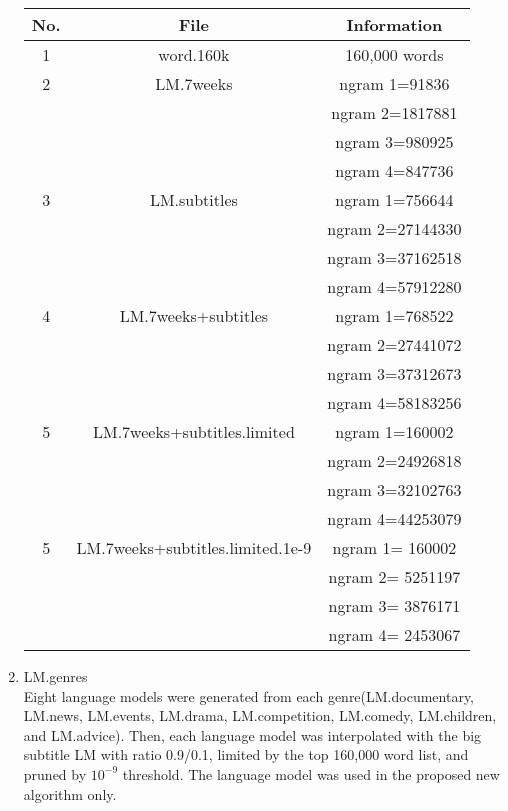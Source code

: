 \begin{enumerate}
\begin{center}
\begin{tabular}{ | c | c | c | }
\hline
\textbf{No.} & \textbf{File}  & \textbf{Information} \\ \hline \hline
1 & word.160k & 160,000 words \\  \hline
2 & LM.7weeks & ngram 1=91836 \\
 & & ngram 2=1817881 \\
 & & ngram 3=980925 \\
 & & ngram 4=847736 \\  \hline
3 & LM.subtitles & ngram 1=756644 \\
 & & ngram 2=27144330 \\
 & & ngram 3=37162518 \\
 & & ngram 4=57912280 \\ \hline
4 & LM.7weeks+subtitles & ngram 1=768522 \\
 & & ngram 2=27441072 \\
 & & ngram 3=37312673 \\
 & & ngram 4=58183256 \\ \hline
5 & LM.7weeks+subtitles.limited & ngram 1=160002 \\
 & & ngram 2=24926818 \\
 & & ngram 3=32102763 \\
 & & ngram 4=44253079 \\ \hline
5 & LM.7weeks+subtitles.limited.1e-9 &ngram  1= 160002 \\
 & & ngram  2=   5251197 \\
 & & ngram  3=   3876171 \\
 & & ngram  4=   2453067 \\ \hline
\end{tabular}
\end{center}

\item LM.genres \\
Eight language models were generated from each genre(LM.documentary, LM.news, LM.events, LM.drama, LM.competition, LM.comedy, LM.children, and LM.advice). Then, each language model was interpolated with the big subtitle LM with  ratio 0.9/0.1, limited by the top 160,000 word list, and pruned by $10^{-9}$ threshold. The language model was used in the proposed new algorithm only.


\end{enumerate}
